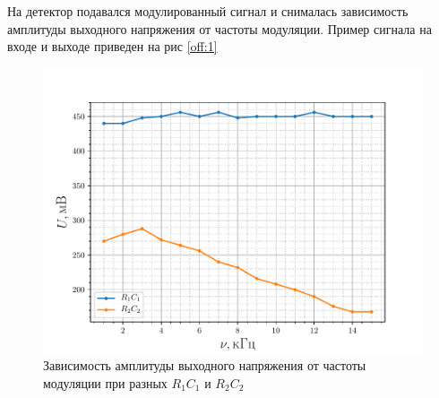 На детектор подавался модулированный сигнал и снималась зависимость амплитуды выходного напряжения от частоты модуляции.
Пример сигнала на входе и выходе приведен на рис \ref{off:1}


\begin{figure}[H]
	\centering
	\includegraphics[width=0.8\linewidth]{fig/exp3b.pdf}
	\caption{Зависимость амплитуды выходного напряжения от частоты модуляции при разных $R_1C_1$ и $R_2C_2$  }
	\label{exp:3.3}
\end{figure}

